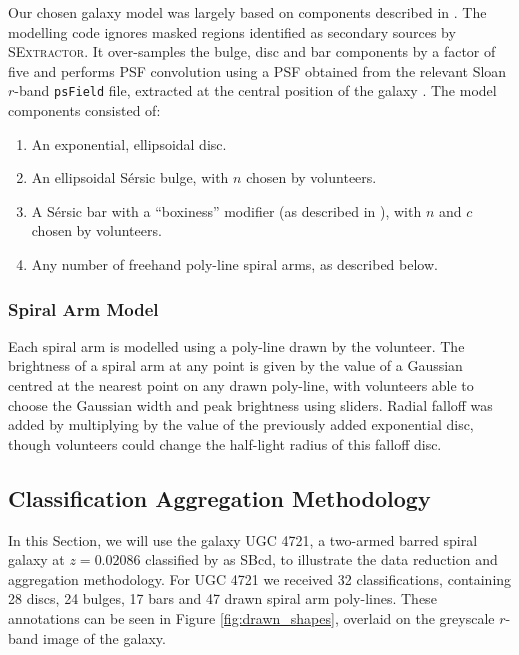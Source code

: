 \documentclass[../main.tex]{subfiles}
\begin{document}
Our chosen galaxy model was largely based on components described in \citet{galfit-paper}. The modelling code ignores masked regions identified as secondary sources by \textsc{SExtractor}. It over-samples the bulge, disc and bar components by a factor of five and performs PSF convolution using a PSF obtained from the relevant Sloan $r$-band \texttt{psField} file, extracted at the central position of the galaxy \citep{2002AJ....123..485S}. The model components consisted of:

\begin{enumerate}
\item An exponential, ellipsoidal disc.
\item An ellipsoidal S\'ersic bulge, with $n$ chosen by volunteers.
\item A S\'ersic bar with a ``boxiness'' modifier (as described in \citealt{galfit-paper}), with $n$ and $c$ chosen by volunteers.
\item Any number of freehand poly-line spiral arms, as described below.
\end{enumerate}

\subsubsection{Spiral Arm Model}
Each spiral arm is modelled using a poly-line drawn by the volunteer. The brightness of a spiral arm at any point is given by the value of a Gaussian centred at the nearest point on any drawn poly-line, with volunteers able to choose the Gaussian width and peak brightness using sliders. Radial falloff was added by multiplying by the value of the previously added exponential disc, though volunteers could change the half-light radius of this falloff disc.

\subsection{Classification Aggregation Methodology}

In this Section, we will use the galaxy UGC 4721, a two-armed barred spiral galaxy at $z=0.02086$ classified by \citet{deVaucouleurs1991} as SBcd, to illustrate the data reduction and aggregation methodology. For UGC 4721 we received 32 classifications, containing 28 discs, 24 bulges, 17 bars and 47 drawn spiral arm poly-lines. These annotations can be seen in Figure \ref{fig:drawn_shapes}, overlaid on the greyscale $r$-band image of the galaxy.

\begin{figure*}
  \caption{Components drawn by volunteers for UGC 4721. The top left panel shows drawn discs, top right shows drawn bulges, bottom left shows drawn bars and bottom right shows drawn spiral arms. Discs, bulges and bars are displayed at twice their effective radii. These raw marks are subsequently aggregated to produce a consensus value for each galaxy component.}
  \label{fig:drawn_shapes}
\end{figure*}
\end{document}
